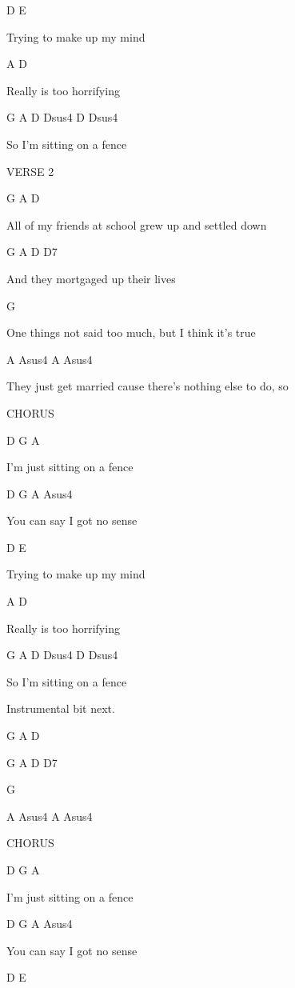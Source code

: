 D             E

Trying to make up my mind

A             D

Really is too horrifying

G       A           D      Dsus4   D  Dsus4

So I'm sitting on a fence


VERSE 2

G           A                                   D

All of my friends at school grew up and settled down

G          A                 D        D7

And they mortgaged up their lives

G

One things not said too much, but I think it's true

A            Asus4                   A             Asus4

They just get married cause there's nothing else to do, so



CHORUS

D        G            A

I'm just sitting on a fence

D       G            A       Asus4

You can say I got no sense

D             E

Trying to make up my mind

A             D

Really is too horrifying

G        A          D      Dsus4   D  Dsus4

So I'm sitting on a fence


Instrumental bit  next.

G           A                         D


G           A                 D        D7


G


A            Asus4              A               Asus4


CHORUS

D        G            A

I'm just sitting on a fence

D       G            A       Asus4

You can say I got no sense

D             E

